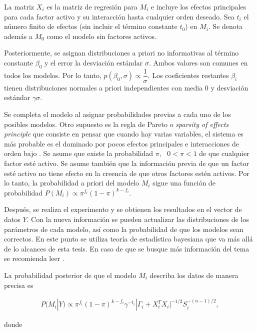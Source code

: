 La matriz $X_i$ es la matriz de regresión para $M_i$ e incluye los efectos principales para cada factor activo y su interacción hasta cualquier orden deseado. Sea $t_i$ el número finito de efectos (sin incluir el término constante $t_0$) en $M_i$. Se denota además a $M_0$ como el modelo sin factores activos. 

Posteriormente, se asignan distribuciones a priori no informativas al término constante $\beta_0$ y el error la desviación estándar $\sigma$. Ambos valores son comunes en todos los modelos. Por lo tanto, $p( \beta_0, \sigma) \propto \dfrac{1}{\sigma}$. Los coeficientes restantes $\beta_i$ tienen distribuciones normales a priori independientes con media 0 y desviación estándar $\gamma \sigma$. 

Se completa el modelo al asignar probabilidades previas a cada uno de los posibles modelos. Otro supuesto es la regla de Pareto o \textit{sparsity of effects principle} que consiste en pensar que cuando hay varias variables, el sistema es más probable es el dominado por pocos efectos principales e interacciones de orden bajo \cite{montgomery2017design}. Se asume que existe la probabilidad $\pi, \text{ } 0 < \pi < 1$ de que cualquier factor esté activo. Se asume también que la información previa de que un factor esté activo no tiene efecto en la creencia de que otros factores estén activos. Por lo tanto, la probabilidad a priori del modelo $M_i$ sigue una función de probabilidad $P(M_i) \propto \pi ^{f_i} (1 - \pi)^{k-f_i}$. 

Después, se realiza el experimento y se obtienen los resultados en el vector de datos \textbf{$Y$}. Con la nueva información se pueden actualizar las distribuciones de los parámetros de cada modelo, así como la probabilidad de que los modelos sean correctos. En este punto se utiliza teoría de estadística bayesiana que va más allá de lo alcances de esta tesis. En caso de que se busque más información del tema se recomienda leer \cite{mendoza_bayesiana}. 

La probabilidad posterior de que el modelo $M_i$ describa los datos de manera precisa es  


\begin{equation*}
	\begin{aligned}
		P(M_i | Y) \propto  \pi ^{f_i} (1 - \pi)^{k-f_i} \gamma^{-t_i} |\Gamma_i + X_i^{T} X_i |^{-1/2} S_i^{-(n-1)/2}, 		
	\end{aligned}
\end{equation*}

\noindent donde

